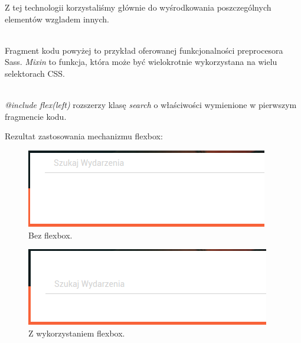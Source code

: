 Z tej technologii korzystaliśmy głównie do wyśrodkowania poszczególnych elementów wzgladem innych.

\begin{code}
	
\end{code}\\

Fragment kodu powyżej to przykład oferowanej funkcjonalności preprocesora Sass. \emph{Mixin} to funkcja, która może być wielokrotnie wykorzystana na wielu selektorach CSS.

\begin{code}
	
\end{code}\\

\emph{@include flex(left)} rozszerzy klasę \emph{search} o właściwości wymienione w pierwszym fragmencie kodu.

Rezultat zastosowania mechanizmu flexbox:\\
\begin{figure}[h]
	\centering
  \includegraphics[scale=0.8]{images/flex_before.png}
  \caption{Bez flexbox.}
\end{figure}

\begin{figure}[h]
	\centering
  \includegraphics[scale=0.8]{images/flex_after.png}
  \caption{Z wykorzystaniem flexbox.}
\end{figure}

